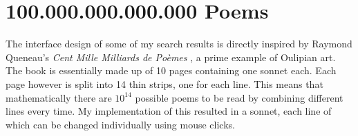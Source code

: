 

\section{100.000.000.000.000 Poems}
\label{s:queneau}

The interface design of some of my search results is directly inspired by
Raymond Queneau's \textit{Cent Mille Milliards de Poèmes} \citeyear{Queneau1961}, a prime example of Oulipian art. The book is essentially made up of \num{10} pages containing one sonnet each. Each page however is split into \num{14} thin strips, one for each line. This means that mathematically there are $10^{14}$ possible poems to be read by combining different lines every time. My implementation of this resulted in a sonnet, each line of which can be changed individually using mouse clicks.

